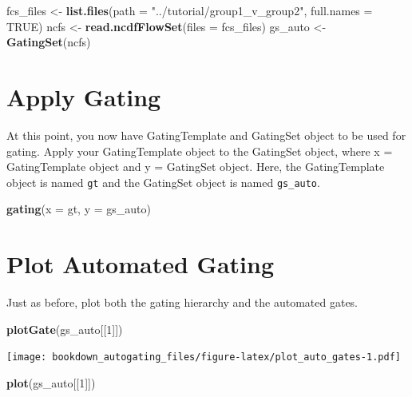 \documentclass[]{book}
\newenvironment{Shaded}{\begin{snugshade}}{\end{snugshade}}
\newcommand{\DataTypeTok}[1]{\textcolor[rgb]{0.13,0.29,0.53}{#1}}
\newcommand{\DecValTok}[1]{\textcolor[rgb]{0.00,0.00,0.81}{#1}}
\newcommand{\KeywordTok}[1]{\textcolor[rgb]{0.13,0.29,0.53}{\textbf{#1}}}
\newcommand{\NormalTok}[1]{#1}
\newcommand{\OtherTok}[1]{\textcolor[rgb]{0.56,0.35,0.01}{#1}}
\newcommand{\StringTok}[1]{\textcolor[rgb]{0.31,0.60,0.02}{#1}}
\begin{document}
\begin{Shaded}
\begin{Highlighting}[]
\NormalTok{fcs_files <-}\StringTok{ }\KeywordTok{list.files}\NormalTok{(}\DataTypeTok{path =} \StringTok{"../tutorial/group1_v_group2"}\NormalTok{, }\DataTypeTok{full.names =} \OtherTok{TRUE}\NormalTok{)}
\NormalTok{ncfs  <-}\StringTok{ }\KeywordTok{read.ncdfFlowSet}\NormalTok{(}\DataTypeTok{files =}\NormalTok{ fcs_files)}
\NormalTok{gs_auto <-}\StringTok{ }\KeywordTok{GatingSet}\NormalTok{(ncfs)}
\end{Highlighting}
\end{Shaded}

\hypertarget{apply-gating}{%
\section{Apply Gating}\label{apply-gating}}

At this point, you now have GatingTemplate and GatingSet object to be used for gating. Apply your GatingTemplate object to the GatingSet object, where x = GatingTemplate object and y = GatingSet object. Here, the GatingTemplate object is named \texttt{gt} and the GatingSet object is named \texttt{gs\_auto}.

\begin{Shaded}
\begin{Highlighting}[]
\KeywordTok{gating}\NormalTok{(}\DataTypeTok{x =}\NormalTok{ gt, }\DataTypeTok{y =}\NormalTok{ gs_auto)}
\end{Highlighting}
\end{Shaded}

\hypertarget{plot-automated-gating}{%
\section{Plot Automated Gating}\label{plot-automated-gating}}

Just as before, plot both the gating hierarchy and the automated gates.

\begin{Shaded}
\begin{Highlighting}[]
\KeywordTok{plotGate}\NormalTok{(gs_auto[[}\DecValTok{1}\NormalTok{]])}
\end{Highlighting}
\end{Shaded}

\texttt{[image: bookdown\_autogating\_files/figure-latex/plot\_auto\_gates-1.pdf]}

\begin{Shaded}
\begin{Highlighting}[]
\KeywordTok{plot}\NormalTok{(gs_auto[[}\DecValTok{1}\NormalTok{]])}
\end{Highlighting}
\end{Shaded}
\end{document}
